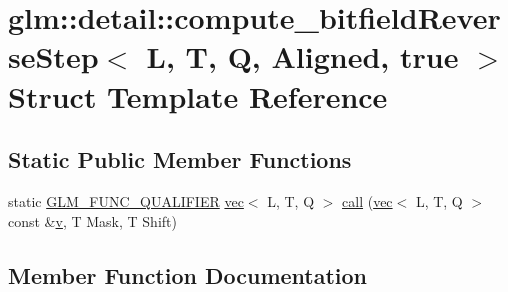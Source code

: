 \hypertarget{structglm_1_1detail_1_1compute__bitfield_reverse_step_3_01_l_00_01_t_00_01_q_00_01_aligned_00_01true_01_4}{}\section{glm\+:\+:detail\+:\+:compute\+\_\+bitfield\+Reverse\+Step$<$ L, T, Q, Aligned, true $>$ Struct Template Reference}
\label{structglm_1_1detail_1_1compute__bitfield_reverse_step_3_01_l_00_01_t_00_01_q_00_01_aligned_00_01true_01_4}
\subsection*{Static Public Member Functions}
\begin{DoxyCompactItemize}
\item 
static \hyperlink{setup_8hpp_a33fdea6f91c5f834105f7415e2a64407}{G\+L\+M\+\_\+\+F\+U\+N\+C\+\_\+\+Q\+U\+A\+L\+I\+F\+I\+ER} \hyperlink{structglm_1_1vec}{vec}$<$ L, T, Q $>$ \hyperlink{structglm_1_1detail_1_1compute__bitfield_reverse_step_3_01_l_00_01_t_00_01_q_00_01_aligned_00_01true_01_4_aaa8d086197cfcab7e6e5b5fdb10224b9}{call} (\hyperlink{structglm_1_1vec}{vec}$<$ L, T, Q $>$ const \&\hyperlink{_s_d_l__opengl_8h_a10a82eabcb59d2fcd74acee063775f90}{v}, T Mask, T Shift)
\end{DoxyCompactItemize}


\subsection{Member Function Documentation}
\mbox{\label{structglm_1_1detail_1_1compute__bitfield_reverse_step_3_01_l_00_01_t_00_01_q_00_01_aligned_00_01true_01_4_aaa8d086197cfcab7e6e5b5fdb10224b9}} 
